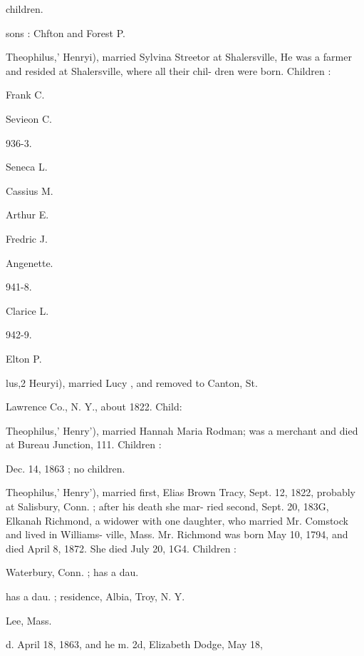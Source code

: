 \documentclass{book}
\begin{document}
children. 


sons : Chfton and Forest P. 


Theophilus,' Henryi), married Sylvina Streetor at Shalersville, 
He was a farmer and resided at Shalersville, where all their chil- 
dren were born. Children : 





Frank C. 




Sevieon C. 


936-3. 


Seneca L. 




Cassius M. 




Arthur E. 




Fredric J. 




Angenette. 


941-8. 


Clarice L. 


942-9. 


Elton P. 




lus,2 Heuryi), married Lucy , and removed to Canton, St. 

Lawrence Co., N. Y., about 1822. Child: 







Theophilus,' Henry'), married Hannah Maria Rodman; was a 
merchant and died at Bureau Junction, 111. Children : 




Dec. 14, 1863 ; no children. 

Theophilus,' Henry'), married first, Elias Brown Tracy, Sept. 
12, 1822, probably at Salisbury, Conn. ; after his death she mar- 
ried second, Sept. 20, 183G, Elkanah Richmond, a widower with 
one daughter, who married Mr. Comstock and lived in Williams- 
ville, Mass. Mr. Richmond was born May 10, 1794, and died 
April 8, 1872. She died July 20, 1G4. Children : 






Waterbury, Conn. ; has a dau. 


has a dau. ; residence, Albia, Troy, N. Y. 


Lee, Mass. 


d. April 18, 1863, and he m. 2d, Elizabeth Dodge, May 18, 
\end{document}
